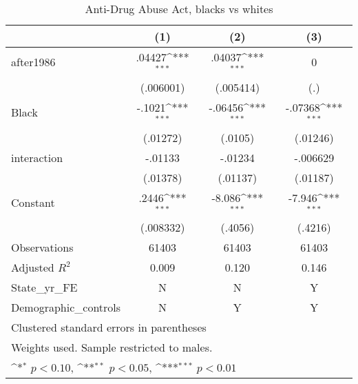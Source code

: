 \begin{table}[htbp]\centering
\tiny
\def\sym#1{\ifmmode^{#1}\else\(^{#1}\)\fi}
\caption{Anti-Drug Abuse Act, blacks vs whites}
\begin{tabular}{l*{3}{c}}
\hline\hline
                    &\multicolumn{1}{c}{(1)}         &\multicolumn{1}{c}{(2)}         &\multicolumn{1}{c}{(3)}         \\
\hline
after1986           &      .04427\sym{***}&      .04037\sym{***}&           0         \\
                    &   (.006001)         &   (.005414)         &         (.)         \\
[1em]
Black               &      -.1021\sym{***}&     -.06456\sym{***}&     -.07368\sym{***}\\
                    &    (.01272)         &     (.0105)         &    (.01246)         \\
[1em]
interaction         &     -.01133         &     -.01234         &    -.006629         \\
                    &    (.01378)         &    (.01137)         &    (.01187)         \\
[1em]
Constant            &       .2446\sym{***}&      -8.086\sym{***}&      -7.946\sym{***}\\
                    &   (.008332)         &     (.4056)         &     (.4216)         \\
\hline
Observations        &       61403         &       61403         &       61403         \\
Adjusted \(R^{2}\)  &       0.009         &       0.120         &       0.146         \\
State\_yr\_FE         &           N         &           N         &           Y         \\
Demographic\_controls&           N         &           Y         &           Y         \\
\hline\hline
\multicolumn{4}{l}{\footnotesize Clustered standard errors in parentheses}\\
\multicolumn{4}{l}{\footnotesize Weights used. Sample restricted to males.}\\
\multicolumn{4}{l}{\footnotesize \sym{*} \(p<0.10\), \sym{**} \(p<0.05\), \sym{***} \(p<0.01\)}\\
\end{tabular}
\end{table}
